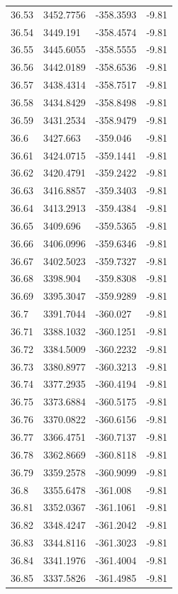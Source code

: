 \begin{table}[H]
\begin{tabular}{llll}
36.53 & 3452.7756 & -358.3593 & -9.81 \\
36.54 & 3449.191 & -358.4574 & -9.81 \\
36.55 & 3445.6055 & -358.5555 & -9.81 \\
36.56 & 3442.0189 & -358.6536 & -9.81 \\
36.57 & 3438.4314 & -358.7517 & -9.81 \\
36.58 & 3434.8429 & -358.8498 & -9.81 \\
36.59 & 3431.2534 & -358.9479 & -9.81 \\
36.6 & 3427.663 & -359.046 & -9.81 \\
36.61 & 3424.0715 & -359.1441 & -9.81 \\
36.62 & 3420.4791 & -359.2422 & -9.81 \\
36.63 & 3416.8857 & -359.3403 & -9.81 \\
36.64 & 3413.2913 & -359.4384 & -9.81 \\
36.65 & 3409.696 & -359.5365 & -9.81 \\
36.66 & 3406.0996 & -359.6346 & -9.81 \\
36.67 & 3402.5023 & -359.7327 & -9.81 \\
36.68 & 3398.904 & -359.8308 & -9.81 \\
36.69 & 3395.3047 & -359.9289 & -9.81 \\
36.7 & 3391.7044 & -360.027 & -9.81 \\
36.71 & 3388.1032 & -360.1251 & -9.81 \\
36.72 & 3384.5009 & -360.2232 & -9.81 \\
36.73 & 3380.8977 & -360.3213 & -9.81 \\
36.74 & 3377.2935 & -360.4194 & -9.81 \\
36.75 & 3373.6884 & -360.5175 & -9.81 \\
36.76 & 3370.0822 & -360.6156 & -9.81 \\
36.77 & 3366.4751 & -360.7137 & -9.81 \\
36.78 & 3362.8669 & -360.8118 & -9.81 \\
36.79 & 3359.2578 & -360.9099 & -9.81 \\
36.8 & 3355.6478 & -361.008 & -9.81 \\
36.81 & 3352.0367 & -361.1061 & -9.81 \\
36.82 & 3348.4247 & -361.2042 & -9.81 \\
36.83 & 3344.8116 & -361.3023 & -9.81 \\
36.84 & 3341.1976 & -361.4004 & -9.81 \\
36.85 & 3337.5826 & -361.4985 & -9.81 \\

\end{tabular}
\end{table}
